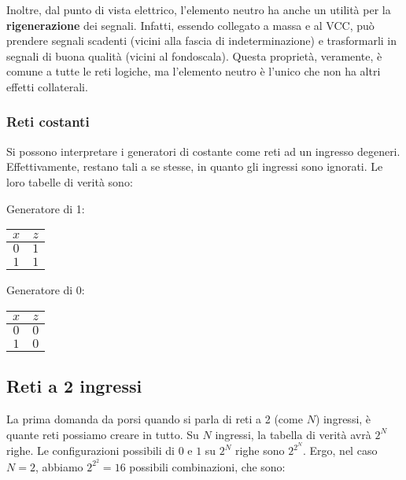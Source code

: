 \documentclass[a4paper,11pt]{article}
\begin{document}
Inoltre, dal punto di vista elettrico, l'elemento neutro ha anche un utilità per la \textbf{rigenerazione} dei segnali.
Infatti, essendo collegato a massa e al VCC, può prendere segnali scadenti (vicini alla fascia di indeterminazione) e trasformarli in segnali di buona qualità (vicini al fondoscala).
Questa proprietà, veramente, è comune a tutte le reti logiche, ma l'elemento neutro è l'unico che non ha altri effetti collaterali.

\subsubsection{Reti costanti}
Si possono interpretare i generatori di costante come reti ad un ingresso degeneri.
Effettivamente, restano tali a se stesse, in quanto gli ingressi sono ignorati.
Le loro tabelle di verità sono:

\begin{center}
\begin{minipage}[t]{0.2\textwidth} %
	Generatore di 1:
\begin{table}[H]
	\center 
	\begin{tabular} { c | c }
		$x$ & $z$ \\ 
		\hline 
		$0$ & $1$ \\
		$1$ & $1$ \\
	\end{tabular}
\end{table}
\end{minipage}%
\hspace{2cm}
\begin{minipage}[t]{0.2\textwidth} %
	Generatore di 0:
\begin{table}[H]
	\center 
	\begin{tabular} { c | c }
		$x$ & $z$ \\ 
		\hline 
		$0$ & $0$ \\
		$1$ & $0$ \\
	\end{tabular}
\end{table}
\end{minipage}
\end{center}

\subsection{Reti a 2 ingressi}
La prima domanda da porsi quando si parla di reti a 2 (come $N$) ingressi, è quante reti possiamo creare in tutto.
Su $N$ ingressi, la tabella di verità avrà $2^N$ righe.
Le configurazioni possibili di $0$ e $1$ su $2^N$ righe sono $2^{2^N}$.
Ergo, nel caso $N=2$, abbiamo $2^{2^2} = 16$ possibili combinazioni, che sono:
\end{document}
